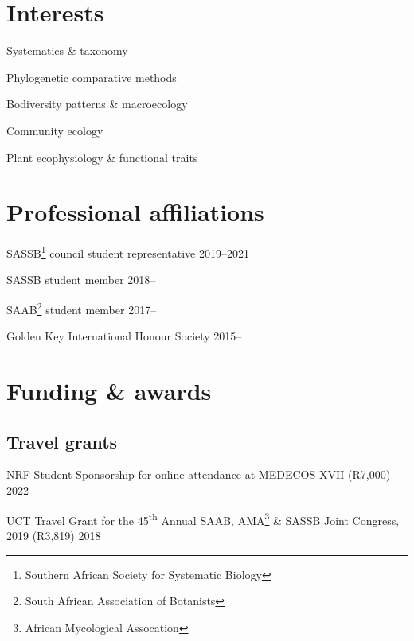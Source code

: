 \documentclass[10pt]{article}
\begin{document}
\begin{multicols}{2}

\section*{Interests} %
    
Systematics \& taxonomy

Phylogenetic comparative methods

Bodiversity patterns \& macroecology

Community ecology

Plant ecophysiology \& functional traits

\section*{Professional affiliations} %

SASSB\footnote{Southern African Society for Systematic Biology}
council student representative                                 \hfill 2019--2021

SASSB student member                                               \hfill 2018--

SAAB\footnote{South African Association of Botanists}
student member                                                     \hfill 2017--

Golden Key International Honour Society                            \hfill 2015--

\end{multicols}

\vfill

\clearpage %

\section*{Funding \& awards} %

\subsection*{Travel grants}

NRF Student Sponsorship for online attendance at MEDECOS XVII
  (R7,000)                                                           \hfill 2022

UCT Travel Grant for the 45\textsuperscript{th} Annual SAAB,
  AMA\footnote{African Mycological Assocation} \& SASSB Joint
  Congress, 2019 (R3,819)                                            \hfill 2018
\end{document}
